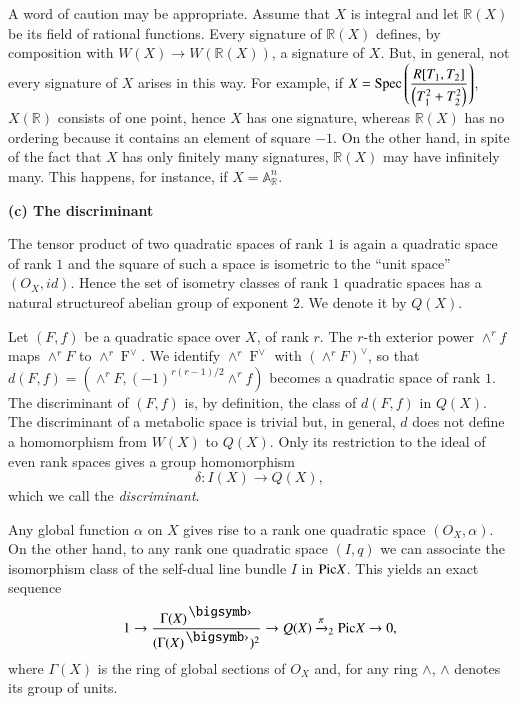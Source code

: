 A word of caution may be appropriate. Assume that $X$ is integral and let $\mathbb{R}(X)$ be its field of rational functions. Every signature of $\mathbb{R}(X)$ defines, by composition with $W(X)\to W(\mathbb{R}(X))$, a signature of $X$. But, in general, not every signature of $X$ arises in this way. For example, if $X=\mathrm{Spec} \left(\dfrac{R[T_1,T_2]}{\left(T^{2}_1+T^{2}_2\right)}\right)$, $X(\mathbb{R})$ consists of one point, hence $X$ has one signature, whereas $\mathbb{R}(X)$ has no ordering because it contains an element of square $-1$. On the other hand, in spite of the fact that $X$ has only finitely many signatures, $\mathbb{R}(X)$ may have infinitely many. This happens, for instance, if $X=\mathbb{A}^{n}_{\mathbb{R}}$.

\medskip 
\noindent
\textbf{(c) The discriminant}

The tensor product of two quadratic spaces of rank $1$ is again a quadratic space of rank $1$ and the square of such a space is isometric to the ``unit space'' $(O_X,id)$. Hence the set of isometry classes of rank $1$ quadratic spaces has a natural structure\pageoriginale of abelian group of exponent $2$. We denote it by $Q(X)$. 

Let $(F,f)$ be a quadratic space over $X$, of rank $r$. The $r$-th exterior power $\displaystyle\mathop{\wedge}^{r}f$ maps $\displaystyle\mathop{\wedge}^{r}F$ to $\displaystyle\mathop{\wedge}^{r}\displaystyle\mathop{F}^{\vee}$. We identify $\displaystyle\mathop{\wedge}^{r}\displaystyle\mathop{F}^{\vee}$ with $\left(\displaystyle\mathop{\wedge}^{r}F\right)^{\vee}$, so that $d(F,f)=\left(\displaystyle\mathop{\wedge}^{r}F,(-1)^{r(r-1)/2}\displaystyle\mathop{\wedge}^{r}f\right)$ becomes a quadratic space of rank $1$. The discriminant of $(F,f)$ is, by definition, the class of $d(F,f)$ in $Q(X)$. The discriminant of a metabolic space is trivial but, in general, $d$ does not define a homomorphism from $W(X)$ to $Q(X)$. Only its restriction to the ideal of even rank spaces gives a group homomorphism 
$$
\delta:I(X)\to Q(X), 
$$
which we call the \textit{discriminant}.

Any global function $\alpha$ on $X$ gives rise to a rank one quadratic space $(O_X,\alpha)$. On the other hand, to any rank one quadratic space $(I,q)$ we can associate the isomorphism class of the self-dual line bundle $I$ in $\mathrm{Pic} X$. This yields an exact sequence 
$$
1\to \dfrac{\Gamma(X)^{\bigdot}}{(\Gamma(X)^{\bigdot})^{2}}\to Q(X)\xrightarrow{\pi}_2\Pic X\to 0, 
$$
where $\Gamma(X)$ is the ring of global sections of $O_X$ and, for any ring $\wedge$, $\wedge$ denotes its group of units. 

